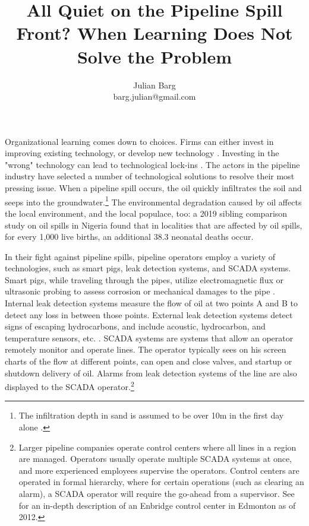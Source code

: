 \documentclass[12pt, man, natbib]{apa6}
\title{All Quiet on the Pipeline Spill Front? When Learning Does Not Solve the Problem}
\author{Julian Barg\\barg.julian@gmail.com}
\affiliation{Ivey Business School}
\begin{document}
	
	\maketitle
	
	\singlespacing
	
	\section{}
	
	Organizational learning comes down to choices. Firms can either invest in improving existing technology, or develop new technology \citep{March1991}. Investing in the "wrong" technology can lead to technological lock-ins \citep{Levinthal1993}. The actors in the pipeline industry have selected a number of technological solutions to resolve their most pressing issue. When a pipeline spill occurs, the oil quickly infiltrates the soil and seeps into the groundwater.\footnote{The infiltration depth in sand is assumed to be over 10m in the first day alone \citep{Bonvicini2015}.} The environmental degradation caused by oil affects the local environment, and the local populace, too: a 2019 sibling comparison study on oil spills in Nigeria found that in localities that are affected by oil spills, for every 1,000 live births, an additional 38.3 neonatal deaths occur\citep{Bruederle2019}. %
	
	In their fight against pipeline spills, pipeline operators employ a variety of technologies, such as smart pigs, leak detection systems, and SCADA systems. Smart pigs, while traveling through the pipes, utilize electromagnetic flux or ultrasonic probing to assess corrosion or mechanical damages to the pipe \citep{Singh2017-7}. Internal leak detection systems measure the flow of oil at two points A and B to detect any loss in between those points. External leak detection systems detect signs of escaping hydrocarbons, and include acoustic, hydrocarbon, and temperature sensors, etc. \citep{Shaw2012}. SCADA systems are systems that allow an operator remotely monitor and operate lines. The operator typically sees on his screen charts of the flow at different points, can open and close valves, and startup or shutdown delivery of oil. Alarms from leak detection systems of the line are also displayed to the SCADA operator.\footnote{Larger pipeline companies operate control centers where all lines in a region are managed. Operators usually operate multiple SCADA systems at once, and more experienced employees supervise the operators. Control centers are operated in formal hierarchy, where for certain operations (such as clearing an alarm), a SCADA operator will require the go-ahead from a supervisor. See \citet{NTSB2012} for an in-depth description of an Enbridge control center in Edmonton as of 2012.}
\end{document}
